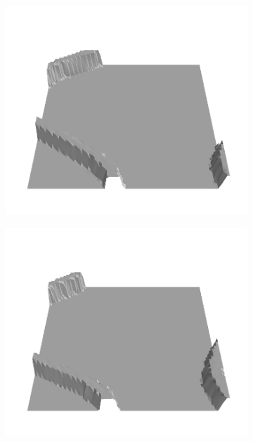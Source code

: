 \documentclass[../document.tex]{subfiles}
\begin{document}
    \begin{figure}[H]
    \centering
        
    \begin{subfigure}[b]{0.19\textwidth}
        \includegraphics[width=\linewidth]{../img/bars1-example-patches/3d/0.png}
    \end{subfigure}
    \begin{subfigure}[b]{0.19\textwidth}
    \includegraphics[width=\linewidth]{../img/bars1-example-patches/3d/2.png}    

\end{subfigure}
\end{figure}
\end{document}
